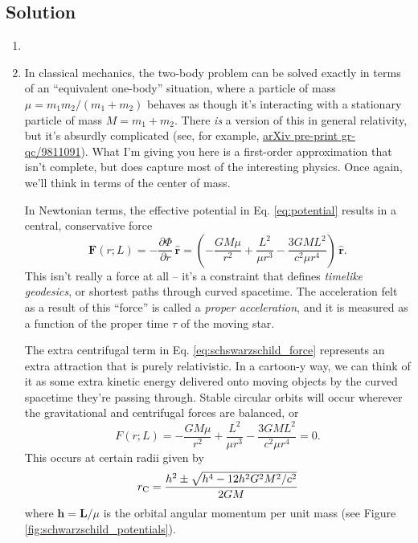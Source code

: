 \documentclass[11pt]{article}
\begin{document}

\vspace{1000pt}


\subsection*{Solution}

\begin{enumerate}

\item 

\item In classical mechanics, the two-body problem can be solved exactly in terms of an ``equivalent one-body'' situation, where a particle of mass $\mu = m_1 m_2/(m_1 + m_2)$ behaves as though it's interacting with a stationary particle of mass $M = m_1 + m_2$. There \emph{is} a version of this in general relativity, but it's absurdly complicated (see, for example, \href{https://arxiv.org/pdf/gr-qc/9811091.pdf}{arXiv pre-print gr-qc/9811091}). What I'm giving you here is a first-order approximation that isn't complete, but does capture most of the interesting physics. Once again, we'll think in terms of the center of mass.

\hspace{15pt} In Newtonian terms, the effective potential in Eq. \ref{eq:potential} results in a central, conservative force
\begin{equation}\label{eq:schswarzschild_force}
\mathbf{F}(r; L) = -\frac{\partial\Phi}{\partial r}\,\hat{\mathbf{r}} = \left( -\frac{GM\mu}{r^2} + \frac{L^2}{\mu r^3} - \frac{3GML^2}{c^2\mu r^4} \right) \, \hat{\mathbf{r}}.
\end{equation}
This isn't really a force at all -- it's a constraint that defines \textit{timelike geodesics}, or shortest paths through curved spacetime. The acceleration felt as a result of this ``force'' is called a \textit{proper acceleration}, and it is measured as a function of the proper time $\tau$ of the moving star.

\hspace{15pt} The extra centrifugal term in Eq. \ref{eq:schswarzschild_force} represents an extra attraction that is purely relativistic. In a cartoon-y way, we can think of it as some extra kinetic energy delivered onto moving objects by the curved spacetime they're passing through. Stable circular orbits will occur wherever the gravitational and centrifugal forces are balanced, or
\[ F(r; L) = -\frac{GM\mu}{r^2} + \frac{L^2}{\mu r^3} - \frac{3GML^2}{c^2\mu r^4} = 0. \]
This occurs at certain radii given by
\begin{equation}\label{eq:circ}
r_{\rm C} = \frac{h^2 \pm \sqrt{h^4 - 12h^2G^2M^2/c^2}}{2GM}
\end{equation}
where $\mathbf{h} = \mathbf{L}/\mu$ is the orbital angular momentum per unit mass (see Figure \ref{fig:schwarzschild_potentials}).


\end{enumerate}
\end{document}
